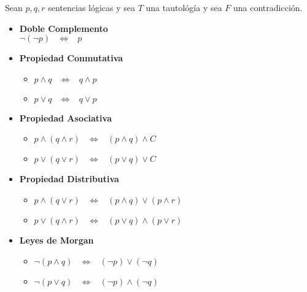 \documentclass[12pt]{report}                                    %
\DeclareMathOperator \Space {\quad}                             %
\DeclareMathOperator \MiniSpace {\;}                            %
\newcommand \lequal {\MiniSpace \Leftrightarrow \MiniSpace}     %
\begin{document}
                Sean $p, q, r$ sentencias lógicas y sea $T$ una tautológía y sea $F$ una contradicción.

                \begin{itemize}
                    \item \textbf{Doble Complemento} \\
                            $\lnot(\lnot p) \lequal p$

                    \item \textbf{Propiedad Conmutativa}
                        \begin{itemize}
                            \item $p \land q \lequal q \land p$
                            \item $p \lor  q \lequal q \lor  p$
                        \end{itemize}

                    \item \textbf{Propiedad Asociativa}
                        \begin{itemize}
                            \item $p \land (q \land r) \lequal (p \land q) \land C$
                            \item $p \lor (q \lor r) \lequal (p \lor q) \lor C$
                        \end{itemize}

                    \item \textbf{Propiedad Distributiva}
                        \begin{itemize}
                            \item $p \land (q \lor r) \lequal (p \land q) \lor (p \land r)$
                            \item $p \lor (q \land r) \lequal (p \lor q) \land (p \lor r)$
                        \end{itemize}

                    \item \textbf{Leyes de Morgan}
                        \begin{itemize}
                            \item $\lnot (p \land q) \lequal (\lnot p) \lor (\lnot q)$
                            \item $\lnot (p \lor q) \lequal (\lnot p) \land (\lnot q)$
                        \end{itemize}

                    \clearpage


\end{itemize}
\end{document}
